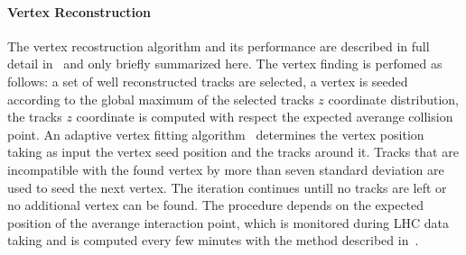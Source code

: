 
\paragraph{Vertex Reconstruction}
The vertex recostruction algorithm and its performance are described in full detail in~\cite{AtlasCSCBook,VertexPerf} and
only briefly summarized here.
The vertex finding is perfomed as follows:  a set of well reconstructed tracks are selected,
a vertex is seeded according to the global maximum of the selected tracks $z$ coordinate distribution, the tracks $z$ coordinate 
is computed with respect the expected averange collision point. 
An adaptive vertex fitting algorithm~\cite{Vertex} determines the vertex position taking as input the vertex seed position and the 
tracks around it. Tracks that are incompatible with the found vertex by more than seven standard deviation
are used to seed the next vertex. The iteration continues untill no tracks are left or no additional vertex can be found.
The procedure depends  on the expected position of the averange interaction point, which is monitored 
during LHC data taking and is computed every few minutes with the method described in~\cite{beamspot}.

